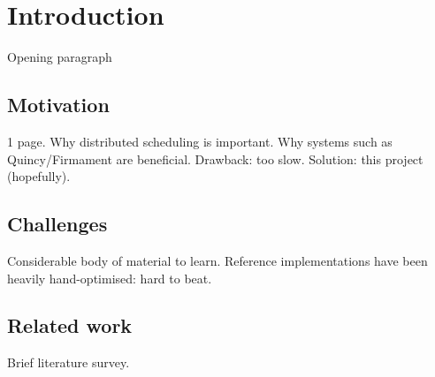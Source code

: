 \chapter{Introduction} \label{chap:intro}

Opening paragraph

\section{Motivation} \label{sec:intro-motivation}
1 page. Why distributed scheduling is important. Why systems such as Quincy/Firmament are beneficial. Drawback: too slow. Solution: this project (hopefully). 

\section{Challenges} \label{sec:intro-challenges}
Considerable body of material to learn. Reference implementations have been heavily hand-optimised: hard to beat. 

\section{Related work} \label{sec:intro-related-work}
Brief literature survey.
